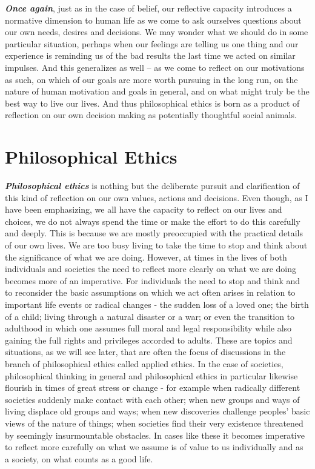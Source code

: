 \documentclass[]{book}
\begin{document}
\textbf{\emph{Once again}}, just as in the case of belief, our reflective capacity introduces a normative dimension to human life as we come to ask ourselves questions about our own needs, desires and decisions. We may wonder what we should do in some particular situation, perhaps when our feelings are telling us one thing and our experience is reminding us of the bad results the last time we acted on similar impulses. And this generalizes as well -- as we come to reflect on our motivations as such, on which of our goals are more worth pursuing in the long run, on the nature of human motivation and goals in general, and on what might truly be the best way to live our lives. And thus philosophical ethics is born as a product of reflection on our own decision making as potentially thoughtful social animals.

\hypertarget{philosophical-ethics}{%
\section{Philosophical Ethics}\label{philosophical-ethics}}

\textbf{\emph{Philosophical ethics}} is nothing but the deliberate pursuit and clarification of this kind of reflection on our own values, actions and decisions. Even though, as I have been emphasizing, we all have the capacity to reflect on our lives and choices, we do not always spend the time or make the effort to do this carefully and deeply. This is because we are mostly preoccupied with the practical details of our own lives. We are too busy living to take the time to stop and think about the significance of what we are doing. However, at times in the lives of both individuals and societies the need to reflect more clearly on what we are doing becomes more of an imperative. For individuals the need to stop and think and to reconsider the basic assumptions on which we act often arises in relation to important life events or radical changes - the sudden loss of a loved one; the birth of a child; living through a natural disaster or a war; or even the transition to adulthood in which one assumes full moral and legal responsibility while also gaining the full rights and privileges accorded to adults. These are topics and situations, as we will see later, that are often the focus of discussions in the branch of philosophical ethics called applied ethics. In the case of societies, philosophical thinking in general and philosophical ethics in particular likewise flourish in times of great stress or change - for example when radically different societies suddenly make contact with each other; when new groups and ways of living displace old groups and ways; when new discoveries challenge peoples' basic views of the nature of things; when societies find their very existence threatened by seemingly insurmountable obstacles. In cases like these it becomes imperative to reflect more carefully on what we assume is of value to us individually and as a society, on what counts as a good life.
\end{document}
